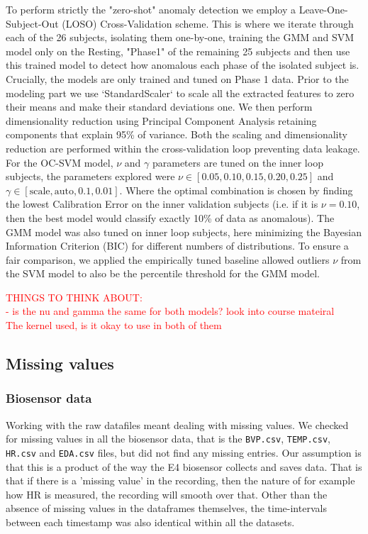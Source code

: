 \documentclass{article}
\begin{document}
To perform strictly the "zero-shot" anomaly detection we employ a Leave-One-Subject-Out (LOSO) Cross-Validation scheme. This is where we iterate through each of the 26 subjects, isolating them one-by-one, training the GMM and SVM model only on the Resting, "Phase1" of the remaining 25 subjects and then use this trained model to detect how anomalous each phase of the isolated subject is. Crucially, the models are only trained and tuned on Phase 1 data. Prior to the modeling part we use `StandardScaler` to scale all the extracted features to zero their means and make their standard deviations one. We then perform dimensionality reduction using Principal Component Analysis retaining components that explain 95\% of variance. Both the scaling and dimensionality reduction are performed within the cross-validation loop preventing data leakage. For the OC-SVM model, $\nu$ and $\gamma$ parameters are tuned on the inner loop subjects, the parameters explored were $\nu \in [0.05, 0.10, 0.15, 0.20, 0.25]$ and $\gamma \in [\text{scale}, \text{auto}, 0.1, 0.01]$. Where the optimal combination is chosen by finding the lowest Calibration Error on the inner validation subjects (i.e. if it is $\nu = 0.10$, then the best model would classify exactly 10\% of data as anomalous). The GMM model was also tuned on inner loop subjects, here minimizing the Bayesian Information Criterion (BIC) for different numbers of distributions. To ensure a fair comparison, we applied the empirically tuned baseline allowed outliers $\nu$ from the SVM model to also be the percentile threshold for the GMM model.

\textcolor{red}{THINGS TO THINK ABOUT: }\\
\textcolor{red}{- is the nu and gamma the same for both models? look into course mateiral}\\
\textcolor{red}{The kernel used, is it okay to use in both of them }

\subsection*{Missing values}
\subsubsection*{Biosensor data}
Working with the raw datafiles meant dealing with missing values. We checked for missing values in all the biosensor data, that is the \texttt{BVP.csv}, \texttt{TEMP.csv}, \texttt{HR.csv} and \texttt{EDA.csv} files, but did not find any missing entries. Our assumption is that this is a product of the way the E4 biosensor collects and saves data. That is that if there is a 'missing value' in the recording, then the nature of for example how HR is measured, the recording will smooth over that. Other than the absence of missing values in the dataframes themselves, the time-intervals between each timestamp was also identical within all the datasets. 
\end{document}
